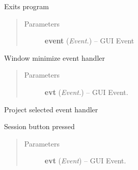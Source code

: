 \documentclass[letterpaper,10pt,english]{sphinxmanual}
\begin{document}
\begin{fulllineitems}

\begin{fulllineitems}
\label{api:wos.GUI.OnExit}
Exits program
\begin{quote}\begin{description}
\item[{Parameters}] \leavevmode
\textbf{event} (\emph{Event.}) -- GUI Event

\end{description}\end{quote}

\end{fulllineitems}


\begin{fulllineitems}
\label{api:wos.GUI.OnIconify}
Window minimize event handler
\begin{quote}\begin{description}
\item[{Parameters}] \leavevmode
\textbf{evt} (\emph{Event.}) -- GUI Event.

\end{description}\end{quote}

\end{fulllineitems}


\begin{fulllineitems}
\label{api:wos.GUI.OnProjectSelected}
Project selected event handler

\end{fulllineitems}


\begin{fulllineitems}
\label{api:wos.GUI.OnSession}
Session button pressed
\begin{quote}\begin{description}
\item[{Parameters}] \leavevmode
\textbf{evt} (\emph{Event}) -- GUI Event.

\end{description}\end{quote}


\end{fulllineitems}
\end{fulllineitems}
\end{document}
